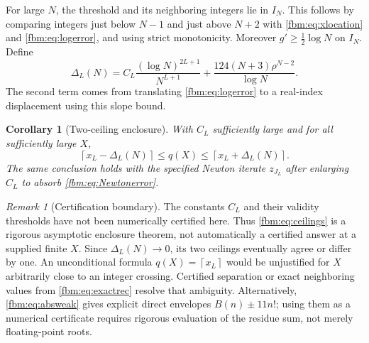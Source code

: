 \documentclass[11pt]{article}
\newtheorem{corollary}[theorem]{Corollary}
\theoremstyle{remark}\newtheorem{remark}[theorem]{Remark}
\newcommand{\ceil}[1]{\left\lceil #1\right\rceil}
\begin{document}
For large $N$, the threshold and its neighboring integers lie in $I_N$. This follows by comparing integers just below $N-1$ and just above $N+2$ with \eqref{fbm:eq:xlocation} and \eqref{fbm:eq:logerror}, and using strict monotonicity. Moreover $g'\geq\tfrac12\log N$ on $I_N$. Define
\begin{equation}\label{fbm:eq:Delta}
 \Delta_L(N)=C_L\frac{(\log N)^{2L+1}}{N^{L+1}}
       +\frac{124(N+3)\rho^{N-2}}{\log N}.
\end{equation}
The second term comes from translating \eqref{fbm:eq:logerror} to a real-index displacement using this slope bound.

\begin{corollary}[Two-ceiling enclosure]\label{fbm:cor:ceilings}
With $C_L$ sufficiently large and for all sufficiently large $X$,
\begin{equation}\label{fbm:eq:ceilings}
 \ceil{x_L-\Delta_L(N)}\leq q(X)\leq\ceil{x_L+\Delta_L(N)}.
\end{equation}
The same conclusion holds with the specified Newton iterate $z_{J_L}$ after enlarging $C_L$ to absorb \eqref{fbm:eq:Newtonerror}.
\end{corollary}

\begin{remark}[Certification boundary]
The constants $C_L$ and their validity thresholds have not been numerically certified here. Thus \eqref{fbm:eq:ceilings} is a rigorous asymptotic enclosure theorem, not automatically a certified answer at a supplied finite $X$. Since $\Delta_L(N)\to0$, its two ceilings eventually agree or differ by one. An unconditional formula $q(X)=\ceil{x_L}$ would be unjustified for $X$ arbitrarily close to an integer crossing. Certified separation or exact neighboring values from \eqref{fbm:eq:exactrec} resolve that ambiguity. Alternatively, \eqref{fbm:eq:absweak} gives explicit direct envelopes $B(n)\pm11n!$; using them as a numerical certificate requires rigorous evaluation of the residue sum, not merely floating-point roots.
\end{remark}
\end{document}
